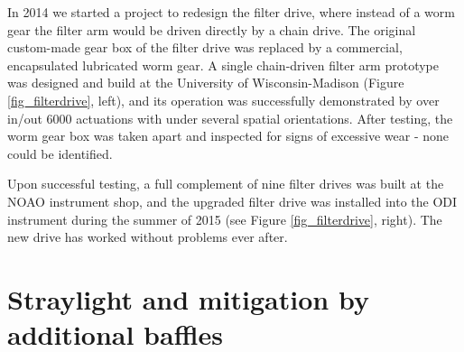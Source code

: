 \documentclass[]{spieman}
\begin{document}
In 2014 we  started a project to redesign the filter drive, where instead of a
worm gear the filter arm would be driven directly by a chain drive. The original
custom-made gear box of the filter drive was replaced by a commercial,
encapsulated lubricated worm gear. A single chain-driven filter arm prototype
was designed and build at the University of Wisconsin-Madison (Figure 
\ref{fig_filterdrive}, left), and
its operation was successfully demonstrated by over in/out 6000 actuations with 
under several spatial orientations. After testing, the worm gear box was taken apart and
inspected for signs of excessive wear - none  could be identified.

Upon successful testing, a full complement of nine filter drives was built at
the NOAO instrument shop, and the upgraded filter drive was installed into the
ODI instrument during the summer of 2015 (see Figure \ref{fig_filterdrive},
right). The new drive has worked without problems ever after.



\section{Straylight and mitigation by additional baffles}
\end{document}
